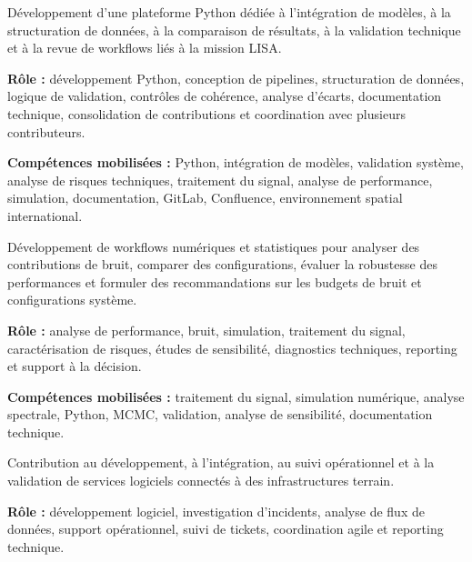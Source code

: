 \documentclass[8pt,a4paper,ragged2e,withhyper]{altacv}
\begin{document}


Développement d’une plateforme Python dédiée à l’intégration de modèles, à la structuration de données, à la comparaison de résultats, à la validation technique et à la revue de workflows liés à la mission LISA.

\textbf{Rôle :} développement Python, conception de pipelines, structuration de données, logique de validation, contrôles de cohérence, analyse d’écarts, documentation technique, consolidation de contributions et coordination avec plusieurs contributeurs.

\textbf{Compétences mobilisées :} Python, intégration de modèles, validation système, analyse de risques techniques, traitement du signal, analyse de performance, simulation, documentation, GitLab, Confluence, environnement spatial international.

\divider


Développement de workflows numériques et statistiques pour analyser des contributions de bruit, comparer des configurations, évaluer la robustesse des performances et formuler des recommandations sur les budgets de bruit et configurations système.

\textbf{Rôle :} analyse de performance, bruit, simulation, traitement du signal, caractérisation de risques, études de sensibilité, diagnostics techniques, reporting et support à la décision.

\textbf{Compétences mobilisées :} traitement du signal, simulation numérique, analyse spectrale, Python, MCMC, validation, analyse de sensibilité, documentation technique.

\divider


Contribution au développement, à l’intégration, au suivi opérationnel et à la validation de services logiciels connectés à des infrastructures terrain.

\textbf{Rôle :} développement logiciel, investigation d’incidents, analyse de flux de données, support opérationnel, suivi de tickets, coordination agile et reporting technique.
\end{document}
